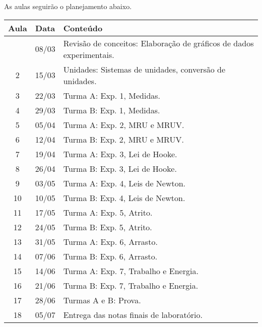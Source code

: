 As aulas seguirão o planejamento abaixo.
\begin{center}
\begin{longtable}{ccp{70mm}}
\toprule
Aula & Data & Conteúdo \\
\midrule
\endhead
\bottomrule
\endfoot
 1 & 08/03 & Revisão de conceitos: Elaboração de gráficos de dados experimentais. \\
 2 & 15/03 & Unidades: Sistemas de unidades, conversão de unidades. \\
 3 & 22/03 & Turma A: Exp. 1, Medidas. \\
 4 & 29/03 & Turma B: Exp. 1, Medidas. \\ 
 5 & 05/04 & Turma A: Exp. 2, MRU e MRUV. \\
 6 & 12/04 & Turma B: Exp. 2, MRU e MRUV. \\
 7 & 19/04 & Turma A: Exp. 3, Lei de Hooke. \\
 8 & 26/04 & Turma B: Exp. 3, Lei de Hooke. \\
 9 & 03/05 & Turma A: Exp. 4, Leis de Newton. \\
10 & 10/05 & Turma B: Exp. 4, Leis de Newton. \\
11 & 17/05 & Turma A: Exp. 5, Atrito. \\
12 & 24/05 & Turma B: Exp. 5, Atrito. \\
13 & 31/05 & Turma A: Exp. 6, Arrasto. \\
14 & 07/06 & Turma B: Exp. 6, Arrasto. \\
15 & 14/06 & Turma A: Exp. 7, Trabalho e Energia. \\
16 & 21/06 & Turma B: Exp. 7, Trabalho e Energia. \\
17 & 28/06 & Turmas A e B: Prova. \\
18 & 05/07 & Entrega das notas finais de laboratório. \\
\end{longtable}
\end{center}

\clearpage

